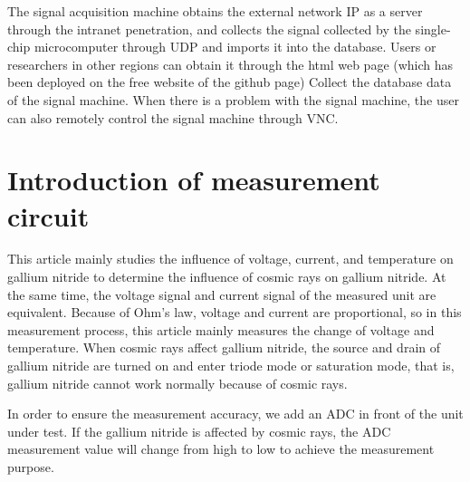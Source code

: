 The signal acquisition machine obtains the external network IP as a server through the intranet penetration, and collects the signal collected by the single-chip microcomputer through UDP and imports it into the database. Users or researchers in other regions can obtain it through the html web page (which has been deployed on the free website of the github page) Collect the database data of the signal machine. When there is a problem with the signal machine, the user can also remotely control the signal machine through VNC.

 
\chapter{Introduction of measurement circuit}
\label{chap:Introduction of measurement circuit}
This article mainly studies the influence of voltage, current, and temperature on gallium nitride to determine the influence of cosmic rays on gallium nitride. At the same time, the voltage signal and current signal of the measured unit are equivalent. Because of Ohm's law, voltage and current are proportional, so in this measurement process, this article mainly measures the change of voltage and temperature. When cosmic rays affect gallium nitride, the source and drain of gallium nitride are turned on and enter triode mode or saturation mode, that is, gallium nitride cannot work normally because of cosmic rays.

In order to ensure the measurement accuracy, we add an ADC in front of the unit under test. If the gallium nitride is affected by cosmic rays, the ADC measurement value will change from high to low to achieve the measurement purpose. 
\\

